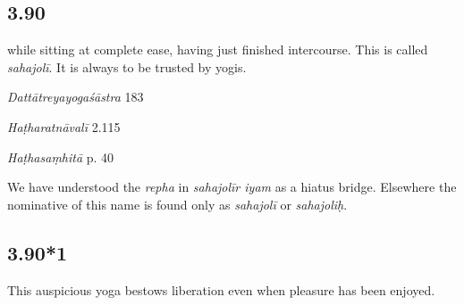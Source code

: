 \begin{ekdosis}
\subsection*{3.90}
\begin{translation}[hp03_090]
[...] while sitting at complete ease, having just finished intercourse. This is called \emph{sahajolī}. It is always to be trusted by yogis. 
\end{translation}


\begin{sources}[hp03_090]
\emph{Dattātreyayogaśāstra} 183
\begin{versinnote}
\end{versinnote}
\end{sources}

\begin{testimonia}[hp03_090]
\emph{Haṭharatnāvalī} 2.115
\begin{versinnote}
\end{versinnote}

\emph{Haṭhasaṃhitā} p. 40
\begin{versinnote}
\end{versinnote}
\end{testimonia}

\begin{philcomm}[hp03_090]
We have understood the \emph{repha} in \emph{sahajolīr iyam} as a hiatus bridge. Elsewhere the nominative of this name is found only as \emph{sahajolī} or \emph{sahajoliḥ}.
\end{philcomm}


\subsection*{3.90*1}
\begin{translation}[hp03_090_1]
This auspicious yoga bestows liberation even when pleasure has been enjoyed.
\end{translation}


\end{ekdosis}
